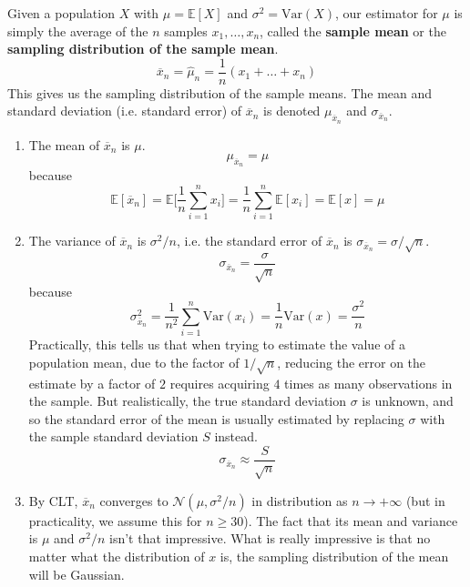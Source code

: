   \begin{definition}
    Given a population $X$ with $\mu = \mathbb{E}[X]$ and $\sigma^2 = \mathrm{Var}(X)$, our estimator for $\mu$ is simply the average of the $n$ samples $x_1, \ldots, x_n$, called the \textbf{sample mean} or the \textbf{sampling distribution of the sample mean}. 
    \begin{equation}
      \overline{x}_n = \widehat{\mu}_n = \frac{1}{n} (x_1 + \ldots + x_n)
    \end{equation}
    This gives us the sampling distribution of the sample means. The mean and standard deviation (i.e. standard error) of $\overline{x}_n$ is denoted $\mu_{\overline{x}_n}$ and $\sigma_{\overline{x}_n}$. 
    \begin{enumerate}
      \item The mean of $\overline{x}_n$ is $\mu$. 
      \begin{equation}
        \mu_{\overline{x}_n} = \mu
      \end{equation}
      because
      \begin{equation}
        \mathbb{E}[\overline{x}_n] = \mathbb{E} \bigg[ \frac{1}{n} \sum_{i=1}^n x_i \bigg] = \frac{1}{n} \sum_{i=1}^n \mathbb{E}[x_i] = \mathbb{E}[x] = \mu
      \end{equation}
      
      \item The variance of $\overline{x}_n$ is $\sigma^2 / n$, i.e. the standard error of $\overline{x}_n$ is $\sigma_{\overline{x}_n} = \sigma / \sqrt{n}$. 
      \begin{equation}
        \sigma_{\overline{x}_n} = \frac{\sigma}{\sqrt{n}}
      \end{equation}
      because 
      \begin{equation}
        \sigma^2_{\overline{x}_n} = \frac{1}{n^2} \sum_{i=1}^n \mathrm{Var}(x_i) = \frac{1}{n} \mathrm{Var}(x) = \frac{\sigma^2}{n}
      \end{equation}
       Practically, this tells us that when trying to estimate the value of a population mean, due to the factor of $1/\sqrt{n}$, reducing the error on the estimate by a factor of $2$ requires acquiring $4$ times as many observations in the sample. But realistically, the true standard deviation $\sigma$ is unknown, and so the standard error of the mean is usually estimated by replacing $\sigma$ with the sample standard deviation $S$ instead. 
      \begin{equation}
        \sigma_{\overline{x}_n} \approx \frac{S}{\sqrt{n}}
      \end{equation}

      \item By CLT, $\overline{x}_n$ converges to $\mathcal{N}(\mu, \sigma^2/n)$ in distribution as $n \rightarrow +\infty$ (but in practicality, we assume this for $n \geq 30$). The fact that its mean and variance is $\mu$ and $\sigma^2 /n$ isn't that impressive. What is really impressive is that no matter what the distribution of $x$ is, the sampling distribution of the mean will be Gaussian. 
    \end{enumerate}
  \end{definition}

